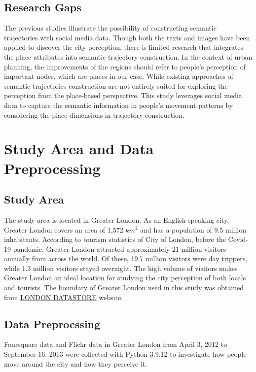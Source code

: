 \documentclass{article}
\begin{document}
\subsection{Research Gaps}
The previous studies illustrate the possibility of constructing semantic trajectories with social media data. Though both the texts and images have been applied to discover the city perception, there is limited research that integrates the place attributes into semantic trajectory construction. In the context of urban planning, the improvements of the regions should refer to people’s perception of important nodes, which are places in our case. While existing approaches of semantic trajectories construction are not entirely suited for exploring the perception from the place-based perspective. This study leverages social media data to capture the semantic information in people’s movement patterns by considering the place dimensions in trajectory construction.
\newpage


\section{Study Area and Data Preprocessing}
\subsection{Study Area}
The study area is located in Greater London. As an English-speaking
city, Greater London covers an area of 1,572 \(km^2\) and has a population of 9.5 million inhabitants. According to tourism statistics of City of London, before the Covid-19 pandemic, Greater London attracted approximately 21 million visitors annually from across the world. Of these, 19.7 million visitors were day trippers, while 1.3 million visitors stayed overnight. The high volume of visitors makes Greater London an ideal location for studying the city perception of both locals and tourists. The boundary of Greater London used in this study was obtained from \href{https://data.london.gov.uk/dataset/statistical-gis-boundary-files-london}{LONDON DATASTORE} website.

\subsection{Data Preprocssing} 
Foursquare data and Flickr data in Greater London from April 3, 2012 to September 16, 2013 were collected with Python 3.9.12 to investigate how people move around the city and how they perceive it.
\end{document}
